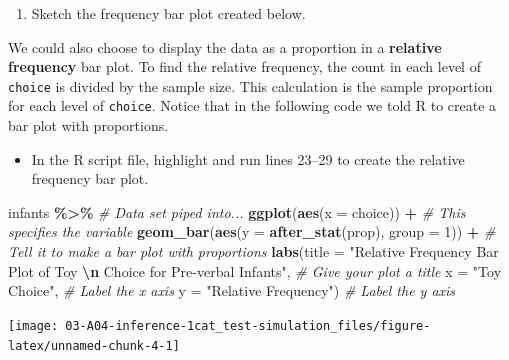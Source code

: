 \documentclass[
]{report}
\newenvironment{Shaded}{\begin{snugshade}}{\end{snugshade}}
\newcommand{\AttributeTok}[1]{\textcolor[rgb]{0.13,0.29,0.53}{#1}}
\newcommand{\CommentTok}[1]{\textcolor[rgb]{0.56,0.35,0.01}{\textit{#1}}}
\newcommand{\DecValTok}[1]{\textcolor[rgb]{0.00,0.00,0.81}{#1}}
\newcommand{\FunctionTok}[1]{\textcolor[rgb]{0.13,0.29,0.53}{\textbf{#1}}}
\newcommand{\NormalTok}[1]{#1}
\newcommand{\SpecialCharTok}[1]{\textcolor[rgb]{0.81,0.36,0.00}{\textbf{#1}}}
\newcommand{\StringTok}[1]{\textcolor[rgb]{0.31,0.60,0.02}{#1}}
\providecommand{\tightlist}{%
  \setlength{\itemsep}{0pt}\setlength{\parskip}{0pt}}
\begin{document}
\begin{enumerate}
\def\labelenumi{\arabic{enumi}.}
\setcounter{enumi}{2}
\tightlist
\item
  Sketch the frequency bar plot created below.
\end{enumerate}

\vspace{1.8in}

We could also choose to display the data as a proportion in a \textbf{relative frequency} bar plot. To find the relative frequency, the count in each level of \texttt{choice} is divided by the sample size. This calculation is the sample proportion for each level of \texttt{choice}. Notice that in the following code we told R to create a bar plot with proportions.

\begin{itemize}
\tightlist
\item
  In the R script file, highlight and run lines 23--29 to create the relative frequency bar plot.
\end{itemize}

\begin{Shaded}
\begin{Highlighting}[]
\NormalTok{infants }\SpecialCharTok{\%\textgreater{}\%} \CommentTok{\# Data set piped into...}
    \FunctionTok{ggplot}\NormalTok{(}\FunctionTok{aes}\NormalTok{(}\AttributeTok{x =}\NormalTok{ choice)) }\SpecialCharTok{+}   \CommentTok{\# This specifies the variable}
    \FunctionTok{geom\_bar}\NormalTok{(}\FunctionTok{aes}\NormalTok{(}\AttributeTok{y =} \FunctionTok{after\_stat}\NormalTok{(prop), }\AttributeTok{group =} \DecValTok{1}\NormalTok{)) }\SpecialCharTok{+}  \CommentTok{\# Tell it to make a bar plot with proportions}
    \FunctionTok{labs}\NormalTok{(}\AttributeTok{title =} \StringTok{"Relative Frequency Bar Plot of Toy }\SpecialCharTok{\textbackslash{}n}\StringTok{ Choice for Pre{-}verbal Infants"}\NormalTok{,  }
       \CommentTok{\# Give your plot a title}
       \AttributeTok{x =} \StringTok{"Toy Choice"}\NormalTok{,   }\CommentTok{\# Label the x axis}
       \AttributeTok{y =} \StringTok{"Relative Frequency"}\NormalTok{)  }\CommentTok{\# Label the y axis}
\end{Highlighting}
\end{Shaded}

\begin{center}\texttt{[image: 03-A04-inference-1cat\_test-simulation\_files/figure-latex/unnamed-chunk-4-1]} \end{center}
\end{document}
